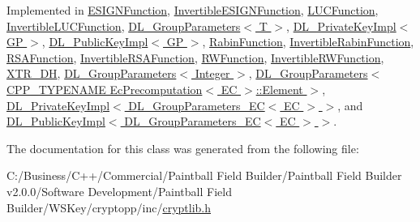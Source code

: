 Implemented in \hyperlink{class_e_s_i_g_n_function_ad9696d3e060bd7acb702b5bfa650eeb7}{ESIGNFunction}, \hyperlink{class_invertible_e_s_i_g_n_function_a7ff23978311f9f86024f8287d3fd02a8}{InvertibleESIGNFunction}, \hyperlink{class_l_u_c_function_a9bc1b75db5e2b09dd2d7cbf0e9801bf8}{LUCFunction}, \hyperlink{class_invertible_l_u_c_function_ad6390a95a003eceef45cc238f538c4d8}{InvertibleLUCFunction}, \hyperlink{class_d_l___group_parameters_aa2b615bc7ed3561914a27a8c456258aa}{DL\_\-GroupParameters$<$ T $>$}, \hyperlink{class_d_l___private_key_impl_aa4ad7f55ea46d222c5e7e37f67bd20fe}{DL\_\-PrivateKeyImpl$<$ GP $>$}, \hyperlink{class_d_l___public_key_impl_a85fab6591b1420642f414d6d9669b298}{DL\_\-PublicKeyImpl$<$ GP $>$}, \hyperlink{class_rabin_function_a0134de415d790de6cb65d5b9940f36e5}{RabinFunction}, \hyperlink{class_invertible_rabin_function_ab943e623f7f1ffb3d890c1ab9e4e3474}{InvertibleRabinFunction}, \hyperlink{class_r_s_a_function_a469fec0f4772d178f8674c2a35f19c51}{RSAFunction}, \hyperlink{class_invertible_r_s_a_function_a35247205517f839220a16287917ce0ce}{InvertibleRSAFunction}, \hyperlink{class_r_w_function_a6280452ff21d540667c6b3f08faba0c9}{RWFunction}, \hyperlink{class_invertible_r_w_function_a7f5052834d9716bfc3a5585c6addbd46}{InvertibleRWFunction}, \hyperlink{class_x_t_r___d_h_ae2fb85f2b1cbfd4fb7c45de61df0ba4b}{XTR\_\-DH}, \hyperlink{class_d_l___group_parameters_aa2b615bc7ed3561914a27a8c456258aa}{DL\_\-GroupParameters$<$ Integer $>$}, \hyperlink{class_d_l___group_parameters_aa2b615bc7ed3561914a27a8c456258aa}{DL\_\-GroupParameters$<$ CPP\_\-TYPENAME EcPrecomputation$<$ EC $>$::Element $>$}, \hyperlink{class_d_l___private_key_impl_aa4ad7f55ea46d222c5e7e37f67bd20fe}{DL\_\-PrivateKeyImpl$<$ DL\_\-GroupParameters\_\-EC$<$ EC $>$ $>$}, and \hyperlink{class_d_l___public_key_impl_a85fab6591b1420642f414d6d9669b298}{DL\_\-PublicKeyImpl$<$ DL\_\-GroupParameters\_\-EC$<$ EC $>$ $>$}.

The documentation for this class was generated from the following file:\begin{DoxyCompactItemize}
\item 
C:/Business/C++/Commercial/Paintball Field Builder/Paintball Field Builder v2.0.0/Software Development/Paintball Field Builder/WSKey/cryptopp/inc/\hyperlink{cryptlib_8h}{cryptlib.h}\end{DoxyCompactItemize}
